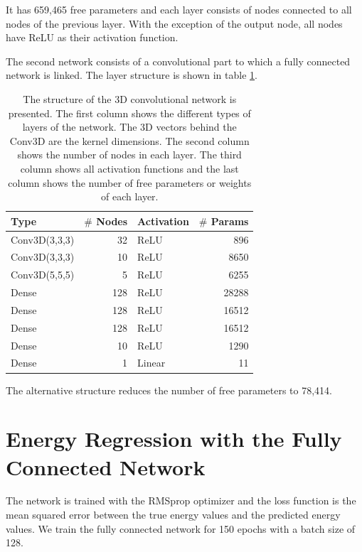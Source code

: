 \documentclass[12pt, a4paper]{thesis}
\begin{document}
It has 659,465 free parameters and each layer consists of nodes
connected to all nodes of the previous layer. With the exception of
the output node, all nodes have ReLU as their activation function.

The second network consists of a convolutional part to which a fully
connected network is linked. The layer structure is shown in table
\ref{conv_structure}.

\begin{table}[htbp]
  \label{conv_structure}
  \caption{The structure of the 3D convolutional network is
    presented. The first column shows the different types of layers of
    the network. The 3D vectors behind the Conv3D are the kernel
    dimensions. The second column shows the number of nodes in each
    layer. The third column shows all activation functions and the
    last column shows the number of free parameters or weights of each
    layer.}
\centering
\begin{tabular}{lrlr}
Type & \(\#\) Nodes & Activation & \(\#\) Params\\
\hline
Conv3D(3,3,3) & 32 & ReLU & 896\\
Conv3D(3,3,3) & 10 & ReLU & 8650\\
Conv3D(5,5,5) & 5 & ReLU & 6255\\
Dense & 128 & ReLU & 28288\\
Dense & 128 & ReLU & 16512\\
Dense & 128 & ReLU & 16512\\
Dense & 10 & ReLU & 1290\\
Dense & 1 & Linear & 11\\
\end{tabular}
\end{table}

The alternative structure reduces the number of free parameters to 78,414.

\section{Energy Regression with the Fully Connected Network}
\label{sec:orgdf3234b}

The network is trained with the RMSprop optimizer and the loss function is the
mean squared error between the true energy values and the predicted energy
values. We train the fully connected network for 150 epochs with a batch size
of 128.
\end{document}
